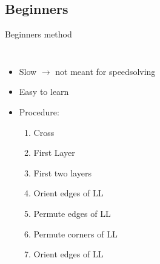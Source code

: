 \documentclass[10pt]{beamer}
\begin{document}
        \subsection{Beginners}
            \begin{frame}{Beginners method}
                \begin{columns}[t]
                    \newline \newline \newline 
                        \begin{itemize}
                            \item<2-> Slow $\rightarrow{}$ not meant for speedsolving \pause{}
                            \item<3-> Easy to learn \pause{}
                            \item<4-> Procedure:
                            \begin{enumerate}
                                \item<5-> Cross
                                \item<6-> First Layer
                                \item<6-> First two layers
                                \item<7-> Orient edges of LL
                                \item<9-> Permute edges of LL
                                \item<10-> Permute corners of LL
                                \item<11-> Orient edges of LL
                            \end{enumerate}
                        \end{itemize}
                        \begin{figure}

\end{figure}
\end{columns}
\end{frame}
\end{document}
